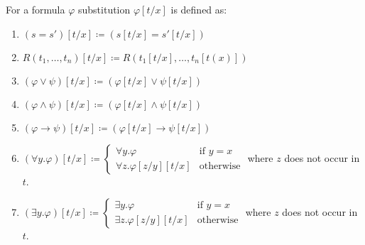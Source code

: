 \begin{boxdef}
\begin{defi}
    For a formula $\varphi$ \alert{substitution $\varphi[t/x]$} is defined as: 
    \begin{enumerate}
        \item $(s = s')[t/x] \coloneq (s[t/x] = s'[t/x])$
        \item $R(t_1, \dots, t_n)[t/x] \coloneq R(t_1[t/x], \dots, t_n[t(x)])$
        \item $(\varphi \lor \psi)[t/x] \coloneq (\varphi[t/x] \lor \psi[t/x])$
        \item $(\varphi \wedge \psi)[t/x] \coloneq (\varphi[t/x] \wedge \psi[t/x])$
        \item $(\varphi \to \psi)[t/x] \coloneq (\varphi[t/x] \to \psi[t/x])$
        \item {$ (\forall y. \varphi)[t/x] \coloneq 
            \begin{cases}
                \forall y. \varphi & \text{if } y = x \\
                \forall z. \varphi[z/y][t/x] & \text{otherwise}
            \end{cases}$ where $z$ does not occur in $t$.}
        \item {$ (\exists y. \varphi)[t/x] \coloneq 
        \begin{cases}
            \exists y. \varphi & \text{if } y = x \\
            \exists z. \varphi[z/y][t/x] & \text{otherwise}
        \end{cases}$ where $z$ does not occur in $t$.}
    \end{enumerate}
\end{defi}
\end{boxdef}

